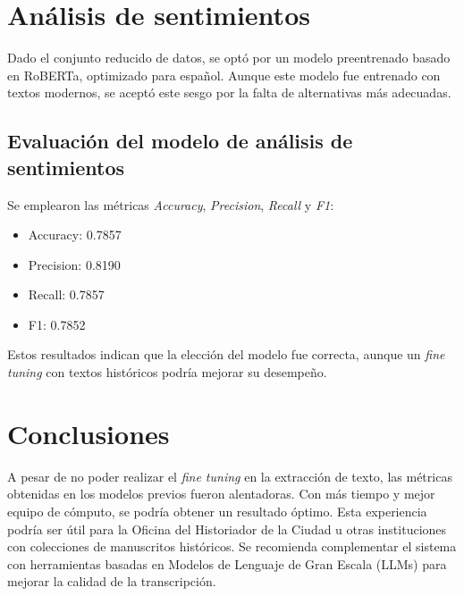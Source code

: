 \documentclass[11pt,a4paper]{article}
\begin{document}
\section{Análisis de sentimientos}
Dado el conjunto reducido de datos, se optó por un modelo preentrenado basado en RoBERTa, optimizado para español. Aunque este modelo fue entrenado con textos modernos, se aceptó este sesgo por la falta de alternativas más adecuadas.

\subsection{Evaluación del modelo de análisis de sentimientos}
Se emplearon las métricas \textit{Accuracy}, \textit{Precision}, \textit{Recall} y \textit{F1}:

\begin{itemize}
    \item Accuracy: 0.7857
    \item Precision: 0.8190
    \item Recall: 0.7857
    \item F1: 0.7852
\end{itemize}

Estos resultados indican que la elección del modelo fue correcta, aunque un \textit{fine tuning} con textos históricos podría mejorar su desempeño.

\section{Conclusiones}
A pesar de no poder realizar el \textit{fine tuning} en la extracción de texto, las métricas obtenidas en los modelos previos fueron alentadoras. Con más tiempo y mejor equipo de cómputo, se podría obtener un resultado óptimo. Esta experiencia podría ser útil para la Oficina del Historiador de la Ciudad u otras instituciones con colecciones de manuscritos históricos. Se recomienda complementar el sistema con herramientas basadas en Modelos de Lenguaje de Gran Escala (LLMs) para mejorar la calidad de la transcripción.
\end{document}

